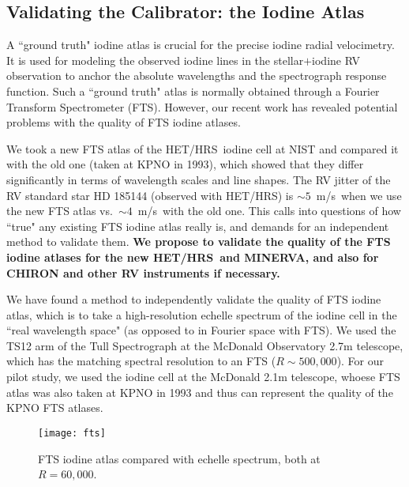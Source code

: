 \documentclass[12pt]{article}
\def\mps{m/s}
\def\minerva{MINERVA}
\def\hrs{HET/HRS}
\begin{document}
\vspace{-10pt}
\subsection{Validating the Calibrator: the Iodine Atlas}\label{sec:fts}
\vspace{-5pt}

A ``ground truth" iodine atlas is crucial for the precise iodine radial
velocimetry. It is used for modeling the observed iodine lines in the
stellar$+$iodine RV observation to anchor the absolute wavelengths and
the spectrograph response function. Such a ``ground truth" atlas is
normally obtained through a Fourier Transform Spectrometer
(FTS). However, our recent work has revealed potential problems with
the quality of FTS iodine atlases.

We took a new FTS atlas of the \hrs\ iodine cell at NIST and compared
it with the old one (taken at KPNO in 1993), which showed that they
differ significantly in terms of wavelength scales and line
shapes. The RV jitter of the RV standard star HD 185144 (observed with
\hrs) is $\sim5$~\mps\ when we use the new FTS atlas
vs.~$\sim4$~\mps\ with the old one. This calls into questions of how
``true" any existing FTS iodine atlas really is, and demands for an
independent method to validate them. \textbf{We propose to validate
  the quality of the FTS iodine atlases for the new \hrs\ and
  \minerva, and also for CHIRON and other RV instruments if
  necessary.}

We have found a method to independently validate the quality of FTS
iodine atlas, which is to take a high-resolution echelle spectrum of
the iodine cell in the ``real wavelength space" (as opposed to in
Fourier space with FTS). We used the TS12 arm of the Tull Spectrograph
at the McDonald Observatory 2.7m telescope, which has the matching
spectral resolution to an FTS ($R \sim 500,000$). For our pilot study,
we used the iodine cell at the McDonald 2.1m telescope, whoese FTS
atlas was also taken at KPNO in 1993 and thus can represent the
quality of the KPNO FTS atlases.

\begin{wrapfigure}{r}{0.5\textwidth}
  \vspace{-35pt}
  \begin{center}
    \texttt{[image: fts]}
  \end{center}
  \vspace{-25pt}  
  \caption{FTS iodine atlas compared with echelle spectrum, both
    at $R=60,000$.}  
  \vspace{-8pt}  
  \label{fig:fts}
\end{wrapfigure}
\end{document}
